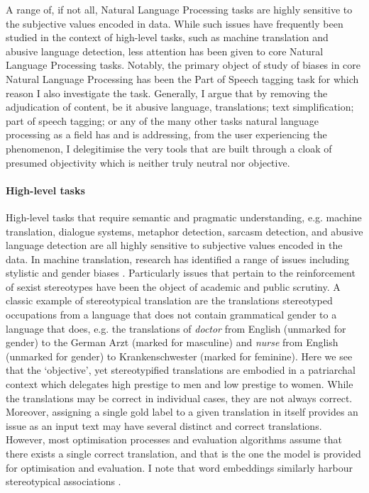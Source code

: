 A range of, if not all, Natural Language Processing tasks are highly sensitive to the subjective values encoded in data. While such issues have frequently been studied in the context of high-level tasks, such as machine translation and abusive language detection, less attention has been given to core Natural Language Processing tasks. Notably, the primary object of study of biases in core Natural Language Processing has been the Part of Speech tagging task \citep{Blodgett:2016,Jorgensen:2016} for which reason I also investigate the task.
Generally, I argue that by removing the adjudication of content, be it abusive language, translations; text simplification; part of speech tagging; or any of the many other tasks natural language processing as a field has and is addressing, from the user experiencing the phenomenon, I delegitimise the very tools that are built through a cloak of presumed objectivity which is neither truly neutral nor objective.

\paragraph{High-level tasks} High-level tasks that require semantic and pragmatic understanding, e.g. machine translation, dialogue systems, metaphor detection, sarcasm detection, and abusive language detection are all highly sensitive to subjective values encoded in the data. In machine translation, research has identified a range of issues including stylistic \citep{Hovy:2020} and gender biases \citep{Vanmassenhove:2018}. Particularly issues that pertain to the reinforcement of sexist stereotypes have been the object of academic \citep{Zhao:2017} and public \citep{Locklear:2018} scrutiny. A classic example of stereotypical translation are the translations stereotyped occupations from a language that does not contain grammatical gender to a language that does, e.g. the translations of \textit{doctor} from English (unmarked for gender) to the German Arzt (marked for masculine) and \textit{nurse} from English (unmarked for gender) to Krankenschwester (marked for feminine). Here we see that the `objective', yet stereotypified translations are embodied in a patriarchal context which delegates high prestige to men and low prestige to women. While the translations may be correct in individual cases, they are not always correct. Moreover, assigning a single gold label to a given translation in itself provides an issue as an input text may have several distinct and correct translations. However, most optimisation processes and evaluation algorithms assume that there exists a single correct translation, and that is the one the model is provided for optimisation and evaluation. I note that word embeddings similarly harbour stereotypical associations \citep{Bolukbasi:2016}.


